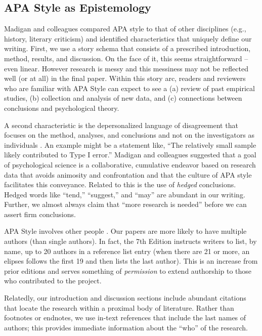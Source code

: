 \documentclass[
  11pt,
]{book}
\begin{document}
\subsection{APA Style as Epistemology}\label{apa-style-as-epistemology}

Madigan \citeyearpar{madigan_language_1995} and colleagues compared APA style to that of other disciplines (e.g., history, literary criticism) and identified characteristics that uniquely define our writing. First, we use a story schema that consists of a prescribed introduction, method, results, and discussion. On the face of it, this seems straightforward -- even linear. However research is messy and this messiness may not be reflected well (or at all) in the final paper. Within this story arc, readers and reviewers who are familiar with APA Style can expect to see a (a) review of past empirical studies, (b) collection and analysis of new data, and (c) connections between conclusions and psychological theory.

A second characteristic is the depersonalized language of disagreement that focuses on the method, analyses, and conclusions and not on the investigators as individuals \citep{madigan_language_1995} . An example might be a statement like, ``The relatively small sample likely contributed to Type I error.'' Madigan and colleagues suggested that a goal of psychological science is a collaborative, cumulative endeavor based on research data that avoids animosity and confrontation and that the culture of APA style facilitates this conveyance. Related to this is the use of \emph{hedged} conclusions. Hedged words like ``tend,'' ``suggest,'' and ``may'' are abundant in our writing. Further, we almost always claim that ``more research is needed'' before we can assert firm conclusions.

APA Style involves other people \citep{madigan_language_1995}. Our papers are more likely to have multiple authors (than single authors). In fact, the 7th Edition instructs writers to list, by name, up to 20 authors in a reference list entry (when there are 21 or more, an elipses follows the first 19 and then lists the last author). This is an increase from prior editions and serves something of \emph{permission} to extend authorship to those who contributed to the project.

Relatedly, our introduction and discussion sections include abundant citations that locate the research within a proximal body of literature. Rather than footnotes or endnotes, we use in-text references that include the last names of authors; this provides immediate information about the ``who'' of the research.
\end{document}
